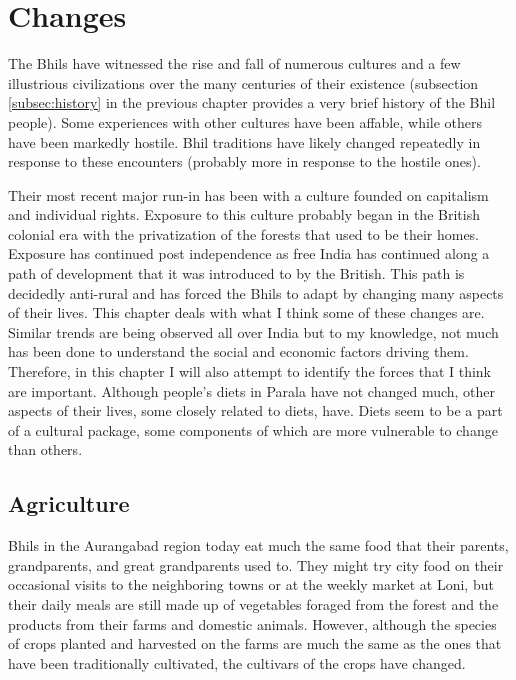 \documentclass[report.tex]{subfiles}
\begin{document}
\chapter{Changes}\label{chp:changes}

The Bhils have witnessed the rise and fall of numerous cultures and a few illustrious civilizations over the many centuries of their existence (subsection \ref{subsec:history} in the previous chapter provides a very brief history of the Bhil people). Some experiences with other cultures have been affable, while others have been markedly hostile. Bhil traditions have likely changed repeatedly in response to these encounters (probably more in response to the hostile ones).

Their most recent major run-in has been with a culture founded on capitalism and individual rights. Exposure to this culture probably began in the British colonial era with the privatization of the forests that used to be their homes. Exposure has continued post independence as free India has continued along a path of development that it was introduced to by the British. This path is decidedly anti-rural and has forced the Bhils to adapt by changing many aspects of their lives. This chapter deals with what I think some of these changes are. Similar trends are being observed all over India but to my knowledge, not much has been done to understand the social and economic factors driving them. Therefore, in this chapter I will also attempt to identify the forces that I think are important. Although people's diets in Parala have not changed much, other aspects of their lives, some closely related to diets, have. Diets seem to be a part of a cultural package, some components of which are more vulnerable to change than others.

\section{Agriculture}\label{sec:agriculture}

Bhils in the Aurangabad region today eat much the same food that their parents, grandparents, and great grandparents used to. They might try city food on their occasional visits to the neighboring towns or at the weekly market at Loni, but their daily meals are still made up of vegetables foraged from the forest and the products from their farms and domestic animals. However, although the species of crops planted and harvested on the farms are much the same as the ones that have been traditionally cultivated, the cultivars of the crops have changed.
\end{document}

